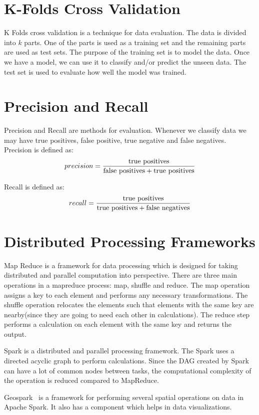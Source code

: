 \section{K-Folds Cross Validation}
K Folds cross validation is a technique for data evaluation\citep{kohavi1995study,refaeilzadeh2009cross}. The data is divided into $k$ parts. One of the parts is used as a training set and the remaining parts are used as test sets. The purpose of the training set is to model the data. Once we have a model, we can use it to classify and/or predict the unseen data. The test set is used to evaluate how well the model was trained.

\section{Precision and Recall}
Precision and Recall are methods for evaluation\citep{olson2008advanced,powers2011evaluation}. Whenever we classify data we may have true positives, false positive, true negative and false negatives. Precision is defined as:
$$precision = \frac{\textnormal{true positives}}{\textnormal{false positives} + \textnormal{true positives}}$$

Recall is defined as:
$$recall = \frac{\textnormal{true positives}}{\textnormal{true positives} + \textnormal{false negatives}}$$

\section{Distributed Processing Frameworks}
Map Reduce\citep{dean2008mapreduce} is a framework for data processing which is designed for taking distributed and parallel computation into perspective. There are three main operations in a mapreduce process: map, shuffle and reduce. The map operation assigns a key to each element and performs any necessary transformations. The shuffle operation relocates the elements such that elements with the same key are nearby(since they are going to need each other in calculations). The reduce step performs a calculation on each element with the same key and returns the output.

Spark\citep{shanahan2015large,zaharia2016apache} is a distributed and parallel processing framework. The Spark uses a directed acyclic graph to perform calculations. Since the DAG created by Spark can have a lot of common nodes between tasks, the computational complexity of the operation is reduced compared to MapReduce.

Geospark~\citep{yu2015geospark} is a framework for performing several spatial operations on data in Apache Spark. It also has a component which helps in data visualizations\citep{yu2018src}.

